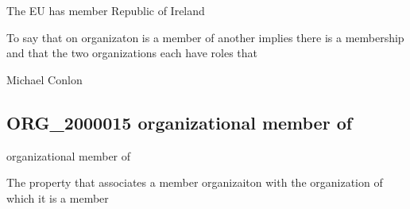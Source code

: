 \documentclass[letterpaper,10pt,english]{sphinxmanual}
\begin{document}
\begin{sphinxShadowBox}

\sphinxAtStartPar
The EU has member Republic of Ireland
\end{sphinxShadowBox}

\begin{sphinxShadowBox}

\sphinxAtStartPar
To say that on organizaton is a member of another implies there is a membership and that the two organizations each have  roles that
\end{sphinxShadowBox}

\begin{sphinxShadowBox}

\sphinxAtStartPar
Michael Conlon 
\end{sphinxShadowBox}
\begin{quote}

\ignorespaces \end{quote}


\subsection{ORG\_2000015 \sphinxhyphen{} organizational member of}
\label{\detokenize{doc-ORG_2000015:org-2000015-organizational-member-of}}\label{\detokenize{doc-ORG_2000015:index-0}}\label{\detokenize{doc-ORG_2000015::doc}}
\begin{sphinxShadowBox}

\sphinxAtStartPar
organizational member of
\end{sphinxShadowBox}

\begin{sphinxShadowBox}

\sphinxAtStartPar
{}
\end{sphinxShadowBox}

\begin{sphinxShadowBox}

\sphinxAtStartPar
The property that associates a member organizaiton with the organization of which it is a member
\end{sphinxShadowBox}
\end{document}
